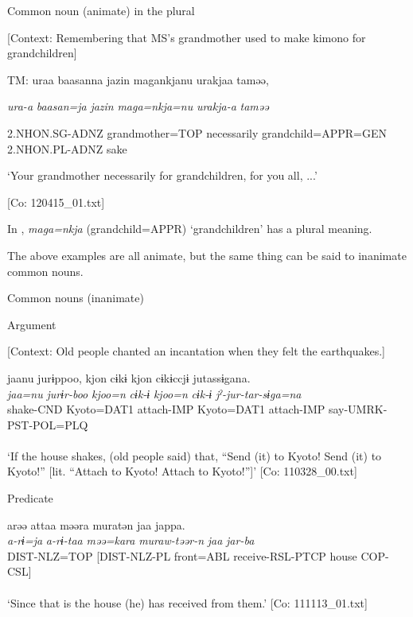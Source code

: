 \ea \label{ex:7:2}  Common noun (animate) in the plural

  [Context: Remembering that MS’s grandmother used to make kimono for grandchildren]

  TM:  uraa  baasanna  jazin  magankjanu urakjaa  taməə,

    \textit{ura-a}  \textit{baasan=ja}  \textit{jazin}  \textit{maga=nkja=nu}   \textit{urakja-a}  \textit{taməə}

    2.NHON.SG-ADNZ  grandmother=TOP  necessarily  grandchild=APPR=GEN  2.NHON.PL-ADNZ  sake
    
    ‘Your grandmother necessarily for grandchildren, for you all, ...’

    [Co: 120415\_01.txt]
\z

In , \textit{maga=nkja} (grandchild=APPR) ‘grandchildren’ has a plural meaning.

  The above examples are all animate, but the same thing can be said to inanimate common nouns.

\ea \label{ex:7:3}  Common nouns (inanimate)

\ea \label{ex:7:3a}Argument

    [Context: Old people chanted an incantation when they felt the earthquakes.]

\gllll  jaanu  jurɨppoo,  kjon  cɨkɨ  kjon   cɨkɨccjɨ  jutassɨgana.\\
\textit{jaa=nu}  \textit{jurɨr-boo}  \textit{kjoo=n}  \textit{cɨk-ɨ}  \textit{kjoo=n}   \textit{cɨk-ɨ}  \textit{jˀ-jur-tar-sɨga=na}\\
[house=NOM]  shake-CND  Kyoto=DAT1  attach-IMP  Kyoto=DAT1  attach-IMP  say-UMRK-PST-POL=PLQ\\
[Subject]        \\
\glt ‘If the house shakes, (old people said) that, “Send (it) to Kyoto! Send (it) to Kyoto!” [lit. “Attach to Kyoto! Attach to Kyoto!”]’ [Co: 110328\_00.txt]

\ex \label{ex:7:3b}Predicate

\gllll  arəə  attaa  məəra  muratən  jaa  jappa.\\
\textit{a-rɨ=ja}  \textit{a-rɨ-taa}  \textit{məə=kara}  \textit{muraw-təər-n}  \textit{jaa}  \textit{jar-ba}\\
DIST-NLZ=TOP  [DIST-NLZ-PL  front=ABL  receive-RSL-PTCP  house                               COP-CSL]\\
[Nominal predicate]\\
\glt ‘Since that is the house (he) has received from them.’ [Co: 111113\_01.txt]

